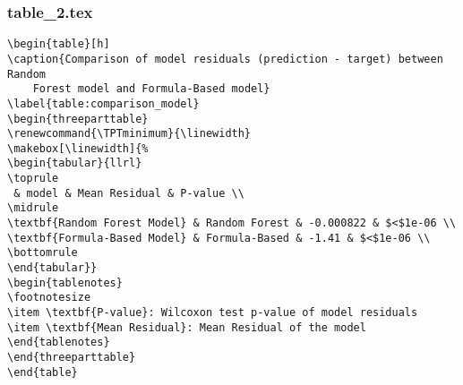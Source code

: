 \documentclass[11pt]{article}
\begin{document}
\subsubsection*{table\_2.tex}

\begin{Verbatim}[tabsize=4]
\begin{table}[h]
\caption{Comparison of model residuals (prediction - target) between Random
	Forest model and Formula-Based model}
\label{table:comparison_model}
\begin{threeparttable}
\renewcommand{\TPTminimum}{\linewidth}
\makebox[\linewidth]{%
\begin{tabular}{llrl}
\toprule
 & model & Mean Residual & P-value \\
\midrule
\textbf{Random Forest Model} & Random Forest & -0.000822 & $<$1e-06 \\
\textbf{Formula-Based Model} & Formula-Based & -1.41 & $<$1e-06 \\
\bottomrule
\end{tabular}}
\begin{tablenotes}
\footnotesize
\item \textbf{P-value}: Wilcoxon test p-value of model residuals
\item \textbf{Mean Residual}: Mean Residual of the model
\end{tablenotes}
\end{threeparttable}
\end{table}

\end{Verbatim}
\end{document}
